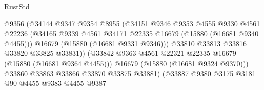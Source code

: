 \begin{lexlean}{RustStd}
\begin{coremodule}
                                          @9356
                                          (@34144
                                            @9347
                                            @9354
                                            @8955
                                            (@34151
                                              @9346
                                              @9353
                                              @4555
                                              @9330
                                              @4561
                                              @22236
                                              (@34165
                                                @9339
                                                @4561
                                                @34171
                                                @22335
                                                @16679
                                                (@15880 (@16681 @9340 @4455)))
                                              @16679
                                              (@15880 (@16681 @9331 @9346)))
                                            @33810
                                            @33813
                                            @33816
                                            @33820
                                            @33825
                                            @33831))
                                        (@33842
                                          @9363
                                          @4561
                                          @22321
                                          @22335
                                          @16679
                                          (@15880 (@16681 @9364 @4455)))
                                        @16679
                                        (@15880 (@16681 @9324 @9370)))
                                      @33860
                                      @33863
                                      @33866
                                      @33870
                                      @33875
                                      @33881)
                                    (@33887
                                      @9380
                                      @3175
                                      @3181
                                      @90
                                      @4455
                                      @9383
                                      @4455
                                      @9387

\end{coremodule}
\end{lexlean}
